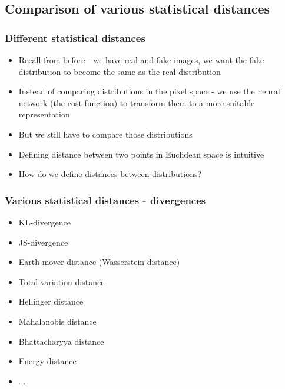 \documentclass{Bredelebeamer}
\begin{document}
\subsection{Comparison of various statistical distances}
\begin{frame}
	\frametitle{Different statistical distances}
	\begin{itemize}[<+->]
		\item Recall from before - we have real and fake images, we want the fake distribution to become the same as the real distribution
		\item Instead of comparing distributions in the pixel space - we use the neural network (the cost function) to transform them to a more suitable representation
		\item But we still have to compare those distributions
		\item Defining distance between two points in Euclidean space is intuitive
		\item How do we define distances between distributions?
	\end{itemize}
\end{frame}
\begin{frame}
	\frametitle{Various statistical distances - divergences}
	\begin{itemize}
		\item KL-divergence
		\item JS-divergence
		\item Earth-mover distance (Wasserstein distance)
		\item Total variation distance
		\item Hellinger distance
		\item Mahalanobis distance
		\item Bhattacharyya distance
		\item Energy distance
		\item ...
	\end{itemize}
\end{frame}
\end{document}
